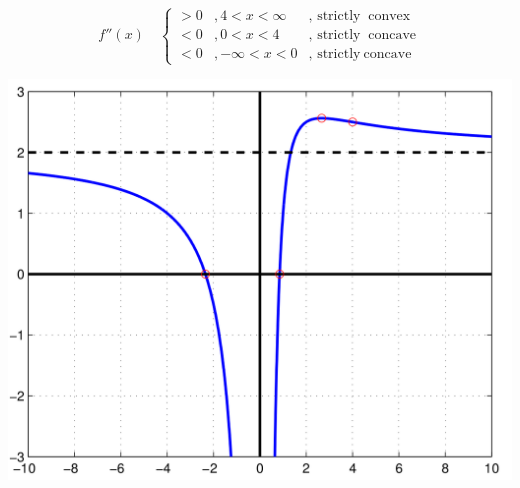 \begin{example}
\begin{enumerate}
        \[ f''(x) \quad \left\{
 	\begin{array}{lll}
	  >0 &, 4 <x <\infty 	 	&, \text{ strictly}\ \text{ convex} \\
	  <0 &, 0<x<4         &, \text{ strictly}\ \text{ concave} \\
	  <0 &, -\infty<x<0             &, \text{ strictly}\ \text{concave} 
 	\end{array}
         \right.
         \]

         \includegraphics{./curvedisc.png}
\end{enumerate}
\end{example}
